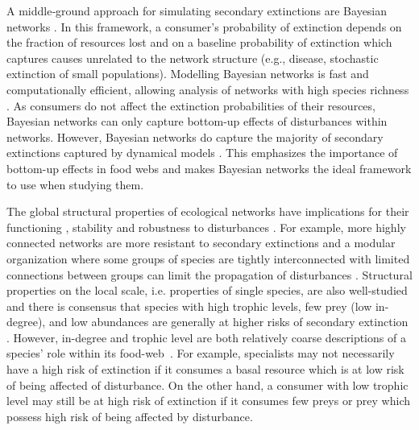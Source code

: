 \documentclass[12pt]{article}
\begin{document}
\begin{spacing}{2.0}
    
    A middle‐ground approach for simulating secondary extinctions are Bayesian networks \citep{Eklof2013}. In this framework, a consumer's probability of extinction depends on the fraction of resources lost and on a baseline probability of extinction which captures causes unrelated to the network structure (e.g., disease, stochastic extinction of small populations). Modelling Bayesian networks is fast and computationally efficient, allowing analysis of networks with high species richness \citep{Haussler2020}. 
    As consumers do not affect the extinction probabilities of their resources, Bayesian networks can only capture bottom-up effects of disturbances within networks. However, Bayesian networks do capture the majority of secondary extinctions captured by dynamical models \citep{Eklof2013}.
    This emphasizes the importance of bottom-up effects in food webs and makes Bayesian networks the ideal framework to use when studying them.  

    The global structural properties of ecological networks have implications for their functioning \citep{Petchey2002}, stability \citep{Allesina2012} and robustness to disturbances \citep{Dunne2002d, Eklof2006}. For example, more highly connected networks are more resistant to secondary extinctions \citep{Dunne2002d, Eklof2006} and a modular organization where some groups of species are tightly interconnected with limited connections between groups can limit the propagation of disturbances \citep{}.
    Structural properties on the local scale, i.e. properties of single species, are also well-studied and there is consensus that species with high trophic levels, few prey (low in-degree), and low abundances are generally at higher risks of secondary extinction \citep{binzer2011susceptibility}. However, in-degree and trophic level are both relatively coarse descriptions of a species' role within its food-web~\citep{Cirtwill2018FoodWebs}. 
    For example, specialists may not necessarily have a high risk of extinction if it consumes a basal resource which is at low risk of being affected of disturbance. On the other hand, a consumer with low trophic level may still be at high risk of extinction if it consumes few preys or prey which possess high risk of being affected by disturbance. 
    

\end{spacing}
\end{document}
